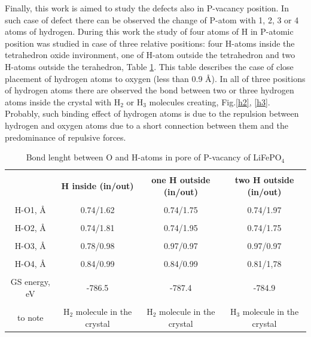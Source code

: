 \documentclass[11pt]{article}
\begin{document}
Finally, this work is aimed to study the defects also in P-vacancy position. In such case of defect there can be observed the change of P-atom with 1, 2, 3 or 4 atoms of hydrogen. During this work the study of four atoms of H in P-atomic position was studied in case of three relative positions: four H-atoms inside the tetrahedron oxide invironment, one of H-atom outside the tetrahedron and two H-atoms outside the terahedron, Table \ref{Ppos}. This table describes the case of close placement of hydrogen atoms to oxygen (less than 0.9 \AA). In all of three positions of hydrogen atoms there are observed the bond between two or three hydrogen atoms inside the crystal with H$_2$ or H$_3$ molecules creating, Fig.\ref{h2}, \ref{h3}. Probably, such binding effect of hydrogen atoms is due to the repulsion between hydrogen and oxygen atoms due to a short connection between them and the predominance of repulsive forces.

\begin{table}[H]
\scriptsize{
\caption{Bond lenght between O and H-atoms in pore of P-vacancy of LiFePO$_4$}
\label{Ppos}
\begin{center}
\begin{tabular}{|c|c|c|c|}
\hline
& & & \\
 \textbf{ } & \textbf{H inside (in/out)}& \textbf{one H outside (in/out)} & \textbf{two H outside (in/out)} \\ 
\hline
& & & \\
H-O1, \AA & 0.74/1.62 & 0.74/1.75 & 0.74/1.97\\ 
\hline
& & & \\
H-O2, \AA & 0.74/1.81 & 0.74/1.95 & 0.74/1.75 \\
\hline
& & & \\
H-O3, \AA & 0.78/0.98 & 0.97/0.97  & 0.97/0.97 \\
\hline
& & & \\
H-O4, \AA & 0.84/0.99 & 0.84/0.99 & 0.81/1,78 \\
\hline
& & & \\
GS energy, eV & -786.5 & -787.4 & -784.9 \\
\hline
& & & \\
to note & H$_2$ molecule in the crystal & H$_2$ molecule in the crystal & H$_3$ molecule in the crystal \\
\hline
\end{tabular}
\end{center}
}
\end{table}
\end{document}
